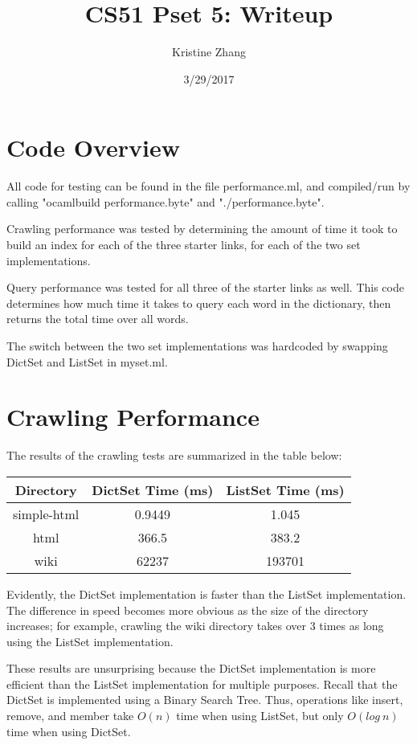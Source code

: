 \documentclass{article}
\begin{document}
\title{CS51 Pset 5: Writeup}
\author{Kristine Zhang}
\date{3/29/2017}
\maketitle

\section{Code Overview}
All code for testing can be found in the file performance.ml, and compiled/run by calling "ocamlbuild performance.byte" and "./performance.byte". 

Crawling performance was tested by determining the amount of time it took to build an index for each of the three starter links, for each of the two set implementations. 

Query performance was tested for all three of the starter links as well. This code determines how much time it takes to query each word in the dictionary, then returns the total time over all words. 

The switch between the two set implementations was hardcoded by swapping DictSet and ListSet in myset.ml. 

\section{Crawling Performance}

The results of the crawling tests are summarized in the table below:

\begin{center}
\begin{tabular}{ |c|c|c| } 
\hline
Directory & DictSet Time (ms) & ListSet Time (ms) \\ 
\hline
simple-html & 0.9449 & 1.045 \\ 
\hline
html & 366.5 & 383.2 \\ 
\hline
wiki & 62237 & 193701 \\
\hline
\end{tabular}
\end{center}

Evidently, the DictSet implementation is faster than the ListSet implementation. The difference in speed becomes more obvious as the size of the directory increases; for example, crawling the wiki directory takes over 3 times as long using the ListSet implementation. 

These results are unsurprising because the DictSet implementation is more efficient than the ListSet implementation for multiple purposes. Recall that the DictSet is implemented using a Binary Search Tree. Thus, operations like insert, remove, and member take $O(n)$ time when using ListSet, but only $O(log\:n)$ time when using DictSet.  
\end{document}
